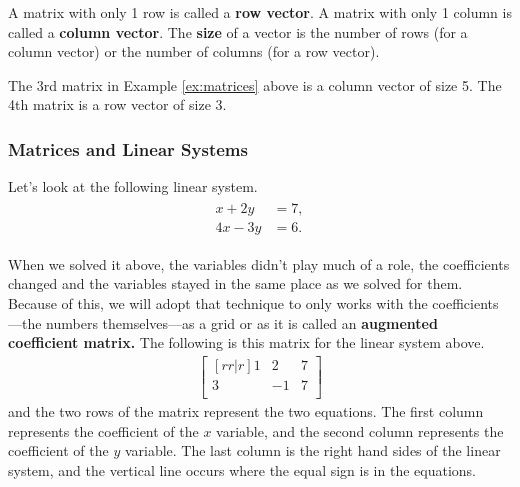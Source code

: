 \begin{definition}
A matrix with only 1 row is called a \textbf{row vector}.  A matrix with only 1 column is called a \textbf{column vector}.  The \textbf{size} of a vector is the number of rows (for a column vector) or the number of columns (for a row vector). 
\end{definition}

The 3rd matrix in Example \ref{ex:matrices} above is a column vector of size 5.  The 4th matrix is a row vector of size 3.


\subsubsection{Matrices and Linear Systems}



Let's look at the following linear system. 
%
\begin{align*}
\begin{split}
x + 2y & = 7, \\
4x -3 y & = 6. 
\end{split}
\end{align*}

When we solved it above, the variables didn't play much of a role, the coefficients changed and the variables stayed in the same place as we solved for them.  Because of this, we will adopt that technique to only works with the coefficients---the numbers themselves---as a grid or as it is called an \textbf{augmented coefficient matrix.}    The following is this matrix for the linear system above.
%
\begin{align*}
\begin{bmatrix}[rr|r]
1 & 2 & 7 \\
3 & -1 & 7 \\
\end{bmatrix}
\end{align*}
and the two rows of the matrix represent the two equations.  The first column represents the coefficient of the $x$ variable, and the second column represents the coefficient of the $y$ variable.  The last column is the right hand sides of the linear system, and the vertical line occurs where the equal sign is in the equations.  

